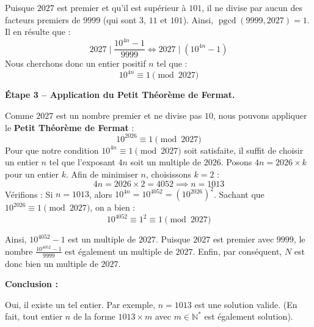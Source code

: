 \documentclass[a4paper,12pt]{article}
\begin{document}
Puisque $2027$ est premier et qu'il est sup\'erieur \`a $101$, il ne divise par aucun des facteurs premiers de $9999$ (qui sont $3$, $11$ et $101$). Ainsi, $\operatorname{pgcd}(9999, 2027) = 1$.
Il en r\'esulte que :
\[
  2027 \mid \frac{10^{4n} - 1}{9999} \iff 2027 \mid \left(10^{4n} - 1\right)
\]
Nous cherchons donc un entier positif $n$ tel que :
\[
  10^{4n} \equiv 1 \pmod{2027}
\]

\bigskip

\textbf{\'Etape 3 -- Application du Petit Th\'eor\`eme de Fermat.}

Comme $2027$ est un nombre premier et ne divise pas $10$, nous pouvons appliquer le \textbf{Petit Th\'eor\`eme de Fermat} :
\[
  10^{2026} \equiv 1 \pmod{2027}
\]
Pour que notre condition $10^{4n} \equiv 1 \pmod{2027}$ soit satisfaite, il suffit de choisir un entier $n$ tel que l'exposant $4n$ soit un multiple de $2026$.
Posons $4n = 2026 \times k$ pour un entier $k$.
Afin de minimiser $n$, choisissons $k = 2$ :
\[
  4n = 2026 \times 2 = 4052 \implies n = 1013
\]
V\'erifions :
Si $n = 1013$, alors $10^{4n} = 10^{4052} = \left(10^{2026}\right)^2$.
Sachant que $10^{2026} \equiv 1 \pmod{2027}$, on a bien :
\[
  10^{4052} \equiv 1^2 \equiv 1 \pmod{2027}
\]

Ainsi, $10^{4052} - 1$ est un multiple de $2027$. Puisque $2027$ est premier avec $9999$, le nombre $\frac{10^{4052} - 1}{9999}$ est \'egalement un multiple de $2027$.
Enfin, par cons\'equent, $N$ est donc bien un multiple de $2027$.

\bigskip

\textbf{Conclusion :}

Oui, il existe un tel entier. Par exemple, \textbf{$n = 1013$} est une solution valide. (En fait, tout entier $n$ de la forme $1013 \times m$ avec $m \in \mathbb{N}^*$ est \'egalement solution).
\end{document}
